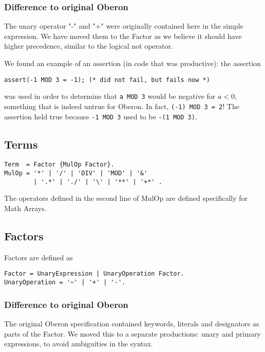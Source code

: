 \documentclass[a4wide,11pt]{article}
\begin{document}
\begin{annotation}
\subsubsection{Difference to original Oberon}
The unary operator "-" and "+" were originally contained here in the simple expression.
We have moved them to the Factor as we believe it should have higher precedence, similar to the logical not operator.

We found an example of an assertion (in code that was productive): the assertion
\begin{lstlisting}[style=example]
	assert(-1 MOD 3 = -1); (* did not fail, but fails now *)
\end{lstlisting}
was used in order to determine that \lstinline"a MOD 3" would be negative for $a<0$, something that is indeed untrue for Oberon.
In fact, \lstinline"(-1) MOD 3 = 2"!
The assertion held true because \lstinline"-1 MOD 3" used to be \lstinline"-(1 MOD 3)".
\end{annotation}

\subsection{Terms}
\begin{lstlisting}[style=ebnf]
Term  = Factor {MulOp Factor}.
MulOp = '*' | '/' | 'DIV' | 'MOD' | '&'
        | '.*' | './' | '\' | '**' | '+*' .
\end{lstlisting}
The operators defined in the second line of MulOp are defined specifically for Math Arrays.


\subsection{Factors}

Factors are defined as
\begin{lstlisting}[style=ebnf]
Factor = UnaryExpression | UnaryOperation Factor.
UnaryOperation = '~' | '+' | '-'.
\end{lstlisting}


\begin{annotation}
\subsubsection{Difference to original Oberon}
The original Oberon specification contained keywords, literals and designators as parts of the Factor.
We moved this to a separate productions: unary and primary expressions, to avoid ambiguities in the syntax.
\end{annotation}
\end{document}

